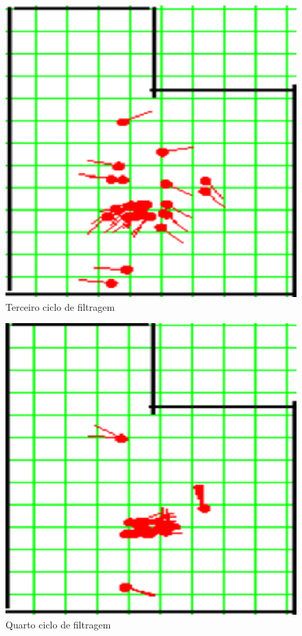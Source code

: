 \begin{figure}[H]
  \centering
  \includegraphics[scale=0.6]{figuras/cen1_ex4/4.eps}
  \caption[Terceiro Ciclo de Filtragem]{Terceiro ciclo de filtragem}
  \label{img:cen1_ex4_4}
\end{figure}

\begin{figure}[H]
  \centering
  \includegraphics[scale=0.6]{figuras/cen1_ex4/5.eps}
  \caption[Quarto Ciclo de Filtragem]{Quarto ciclo de filtragem}
  \label{img:cen1_ex4_5}
\end{figure}

